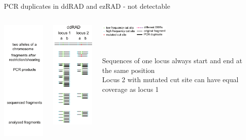 \documentclass[presentation]{beamer}
\begin{document}
\begin{frame}[label=sec-3-2-2]{PCR duplicates in ddRAD and ezRAD - not detectable}
\vspace{0.1cm}

\begin{columns}
\begin{column}{0.3\columnwidth}
\begin{raggedright}
\includegraphics[width=2.8cm]{Schweyen2014Fig2a.png}
\end{raggedright}
\end{column}

\begin{column}{0.3\columnwidth}
\begin{raggedleft}
\includegraphics[width=2.8cm]{Schweyen2014Fig2c.png}
\end{raggedleft}
\end{column}
\begin{column}{0.3\columnwidth}
\begin{raggedleft}
\includegraphics[width=3.5cm]{Schweyen2014Fig2e.png}
\end{raggedleft}
\tiny{\citep{Schweyen2014}}\\
Sequences of one locus always start and end at the same position\\
Locus 2 with mutated cut site can have equal coverage as locus 1
\end{column}
\end{columns}
\end{frame}
\end{document}
